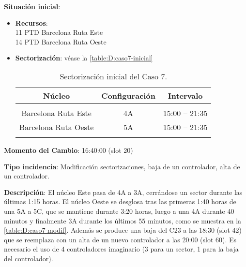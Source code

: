 \textbf{Situación inicial}:
\begin{itemize}[label={}]
	
	\item \textbf{Recursos}: \\
	11 PTD Barcelona Ruta Este \\
	14 PTD Barcelona Ruta Oeste
	
	
	\item \textbf{Sectorización}: véase la \autoref{table:D:caso7-inicial}
	\begin{table}[h]
		\centering
		\caption{Sectorización inicial del Caso 7.}
		\label{table:D:caso7-inicial}
		\begin{tabular}{ccc}
			\hline
			\multicolumn{1}{c}{\textbf{Núcleo}} & \multicolumn{1}{c}{\textbf{Configuración}} & \multicolumn{1}{c}{\textbf{Intervalo}} \\ \hline
			&                                            &                                        \\
			Barcelona Ruta Este                 & 4A                                         & 15:00 -- 21:35                         \\
			Barcelona Ruta   Oeste              & 5A                                         & 15:00 -- 21:35                         \\
			\multicolumn{1}{c}{}                &                                            &                                        \\ \hline
		\end{tabular}
	\end{table}
\end{itemize}

\textbf{Momento del Cambio}: 16:40:00 (slot 20)

\textbf{Tipo incidencia}: Modificación sectorizaciones, baja de un controlador, alta de un controlador.

\textbf{Descripción}: El núcleo Este pasa de 4A a 3A, cerrándose un sector durante las últimas 1:15 horas. El núcleo Oeste se desglosa tras las primeras 1:40 horas de una 5A a 5C, que se mantiene durante 3:20 horas, luego a una 4A durante 40 minutos y finalmente 3A durante los últimos 55 minutos, como se muestra en la \autoref{table:D:caso7-modif}. Además se produce una baja del C23 a las 18:30 (slot 42) que se reemplaza con un alta de un nuevo controlador a las 20:00 (slot 60). Es necesario el uso de 4 controladores imaginario (3 para un sector, 1 para la baja del controlador).

